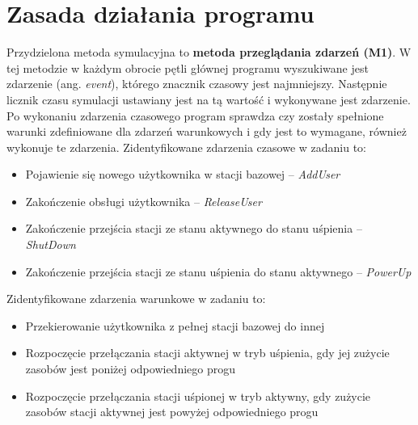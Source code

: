 \newpage
\section{Zasada działania programu}
Przydzielona metoda symulacyjna to \textbf{metoda przeglądania zdarzeń (M1)}. W tej metodzie w każdym obrocie pętli głównej programu wyszukiwane jest zdarzenie (ang. \emph{event}), którego znacznik czasowy jest najmniejszy. Następnie licznik czasu symulacji ustawiany jest na tą wartość i wykonywane jest zdarzenie. Po wykonaniu zdarzenia czasowego program sprawdza czy zostały spełnione warunki zdefiniowane dla zdarzeń warunkowych i gdy jest to wymagane, również wykonuje te zdarzenia. 
\newline\newline
\noindent Zidentyfikowane zdarzenia czasowe w zadaniu to:
\begin{itemize}
\item Pojawienie się nowego użytkownika w stacji bazowej -- \emph{AddUser}
\item Zakończenie obsługi użytkownika -- \emph{ReleaseUser}
\item Zakończenie przejścia stacji ze stanu aktywnego do stanu uśpienia -- \emph{ShutDown}
\item Zakończenie przejścia stacji ze stanu uśpienia do stanu aktywnego -- \emph{PowerUp}
\end{itemize}

\noindent Zidentyfikowane zdarzenia warunkowe w zadaniu to:
\begin{itemize}
\item Przekierowanie użytkownika z pełnej stacji bazowej do innej
\item Rozpoczęcie przełączania stacji aktywnej w tryb uśpienia, gdy jej zużycie zasobów jest poniżej odpowiedniego progu
\item Rozpoczęcie przełączania stacji uśpionej w tryb aktywny, gdy zużycie zasobów stacji aktywnej jest powyżej odpowiedniego progu
\end{itemize}

